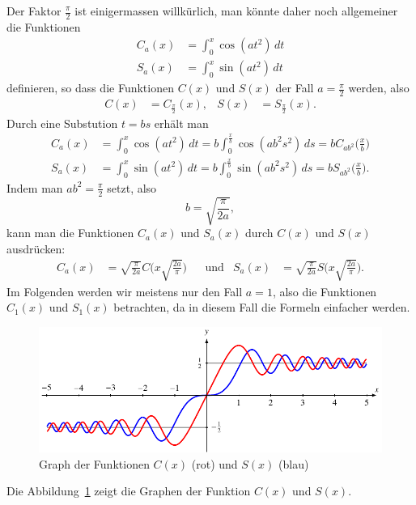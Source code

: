 Der Faktor $\frac{\pi}2$ ist einigermassen willkürlich, man könnte
daher noch allgemeiner die Funktionen
\begin{align*}
C_a(x) &= \int_0^x \cos(at^2)\,dt
\\
S_a(x) &= \int_0^x \sin(at^2)\,dt
\end{align*}
definieren, so dass die Funktionen $C(x)$ und $S(x)$ der Fall
$a=\frac{\pi}2$ werden, also
\[
\begin{aligned}
C(x) &= C_{\frac{\pi}2}(x),
&
S(x) &= S_{\frac{\pi}2}(x).
\end{aligned}
\]
Durch eine Substution $t=bs$ erhält man
\begin{align*}
C_a(x)
&=
\int_0^x \cos(at^2)\,dt
=
b
\int_0^{\frac{x}b} \cos(ab^2s^2)\,ds
=
b
C_{ab^2}\biggl(\frac{x}b\biggr)
\\
S_a(x)
&=
\int_0^x \sin(at^2)\,dt
=
b
\int_0^{\frac{x}b} \sin(ab^2s^2)\,ds
=
b
S_{ab^2}\biggl(\frac{x}b\biggr).
\end{align*}
Indem man $ab^2=\frac{\pi}2$ setzt, also
\[
b
=
\sqrt{\frac{\pi}{2a}}
,
\]
kann man die Funktionen $C_a(x)$ und $S_a(x)$ durch $C(x)$ und $S(x)$
ausdrücken:
\begin{align}
C_a(x)
&=
\sqrt{\frac{\pi}{2a}}
C\biggl(x
\sqrt{\frac{2a}{\pi}}
\biggr)
&&\text{und}&
S_a(x)
&=
\sqrt{\frac{\pi}{2a}}
S\biggl(x
\sqrt{\frac{2a}{\pi}}
\biggr).
\label{fresnel:equation:arg}
\end{align}
Im Folgenden werden wir meistens nur den Fall $a=1$, also die Funktionen
$C_1(x)$ und $S_1(x)$ betrachten, da in diesem Fall die Formeln einfacher
werden.
\begin{figure}
\centering
\includegraphics{papers/fresnel/fresnelgraph.pdf}
\caption{Graph der Funktionen $C(x)$ ({\color{red}rot}) 
und $S(x)$ ({\color{blue}blau})
\label{fresnel:figure:plot}}
\end{figure}
Die Abbildung~\ref{fresnel:figure:plot} zeigt die Graphen der
Funktion $C(x)$ und $S(x)$.

